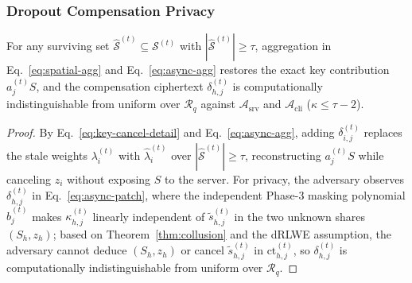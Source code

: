 \subsubsection{Dropout Compensation Privacy}
\begin{theorem}
\label{thm:dropout}
For any surviving set $\widehat{\mathcal{S}}^{(t)} \subseteq \mathcal{S}^{(t)}$ with $|\widehat{\mathcal{S}}^{(t)}| \ge \tau$, aggregation in Eq.~\eqref{eq:spatial-agg} and Eq.~\eqref{eq:async-agg} restores the exact key contribution $a_j^{(t)} S$, and the compensation ciphertext $\delta_{h,j}^{(t)}$ is computationally indistinguishable from uniform over $\mathcal{R}_q$ against $\mathcal{A}_{\mathrm{srv}}$ and $\mathcal{A}_{\mathrm{cli}}$ ($\kappa \le \tau - 2$).
\end{theorem}
\begin{proof}
By Eq.~\eqref{eq:key-cancel-detail} and Eq.~\eqref{eq:async-agg}, adding $\delta_{i,j}^{(t)}$ replaces the stale weights $\lambda_i^{(t)}$ with $\widehat{\lambda}_i^{(t)}$ over $|\widehat{\mathcal{S}}^{(t)}| \ge \tau$, reconstructing $a_j^{(t)}S$ while canceling $z_i$ without exposing $S$ to the server. For privacy, the adversary observes $\delta_{h,j}^{(t)}$ in Eq.~\eqref{eq:async-patch}, where the independent Phase-3 masking polynomial $\hat{b}_j^{(t)}$ makes $\kappa_{h,j}^{(t)}$ linearly independent of $\tilde{s}_{h,j}^{(t)}$ in the two unknown shares $(S_h, z_h)$; based on Theorem~\ref{thm:collusion} and the dRLWE assumption, the adversary cannot deduce $(S_h, z_h)$ or cancel $\tilde{s}_{h,j}^{(t)}$ in $\mathrm{ct}_{h,j}^{(t)}$, so $\delta_{h,j}^{(t)}$ is computationally indistinguishable from uniform over $\mathcal{R}_q$.
\end{proof}

